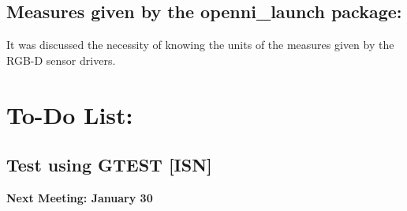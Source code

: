 \documentclass{article}
\newenvironment{myindentpar}[1]%
 {\begin{list}{}%
         {\setlength{\leftmargin}{#1}}%
         \item[]%
 }
 {\end{list}}
\begin{document}
	\subsection{ Measures given by the openni_launch package: 
}
		\begin{myindentpar}{1cm} 
It was discussed the necessity of knowing the units of the measures given by the RGB-D sensor drivers. 
		\end{myindentpar}





\section{\LARGE To-Do List: }
	\subsection{Test using GTEST [ISN]}
		\begin{myindentpar}{1cm} 

		\end{myindentpar}



\begin {center}
{\Large \textbf{Next Meeting: January 30 }}
\end{center}
\end{document}
